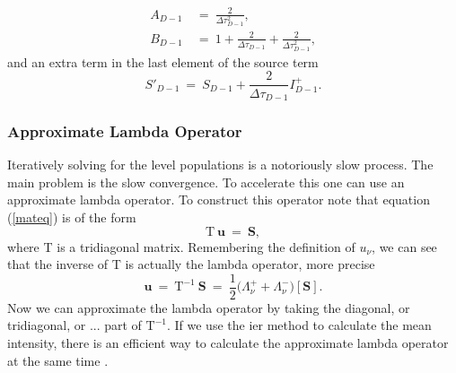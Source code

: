 \documentclass[]{article}
\begin{document}
\begin{equation}
\begin{split}
A_{D-1} \ &= \ \frac{2}{\Delta\tau_{D-1}^{2}}, \\
B_{D-1} \ &= \ 1 + \frac{2}{\Delta\tau_{D-1}} + \frac{2}{\Delta\tau_{D-1}^{2}},
\end{split}
\end{equation}
and an extra term in the last element of the source term
\begin{equation}
S'_{D-1}  \ = \  S_{D-1} + \frac{2}{\Delta\tau_{D-1}} I_{D-1}^{+}.
\end{equation}


\subsubsection{Approximate Lambda Operator}

Iteratively solving for the level populations is a notoriously slow process. The main problem is the slow convergence. To accelerate this one can use an approximate lambda operator. To construct this operator note that equation (\ref{mateq}) is of the form
\begin{equation}
\text{T} \ \textbf{u} \ = \ \textbf{S},
\end{equation}
where T is a tridiagonal matrix. Remembering the definition of  $u_{\nu}$, we can see that the inverse of T is actually the lambda operator, more precise
\begin{equation}
\textbf{u} \ = \ \text{T}^{-1} \ \textbf{S} \ = \ \frac{1}{2}\big(\Lambda^{+}_{\nu} + \Lambda^{-}_{\nu} \big) [\textbf{S}].
\end{equation}
Now we can approximate the lambda operator by taking the diagonal, or tridiagonal, or ... part of $\text{T}^{-1}$. If we use the ier method to calculate the mean intensity, there is an efficient way to calculate the approximate lambda operator at the same time \cite{Rybicki1991}.

\bigskip
\end{document}
